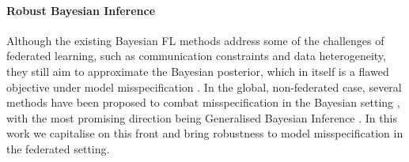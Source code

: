 \paragraph{Robust Bayesian Inference} 
Although the existing Bayesian FL methods address some of the challenges of federated learning, such as communication constraints and data heterogeneity, they still aim to approximate the Bayesian posterior, which in itself is a flawed objective under model misspecification \citep{walker2013, berk1966, bernardo2000}.
In the global, non-federated case, several methods have been proposed to combat misspecification in the Bayesian setting \citep{gruenwald2012}, with the most promising direction being Generalised Bayesian Inference \citep{hooker2014, bissiri2016, ghosh2016a, jewson2018, miller2021, alquier2021,jeremias2022, matsubara2022}. In this work we capitalise on this front and bring robustness to model misspecification in the federated setting.